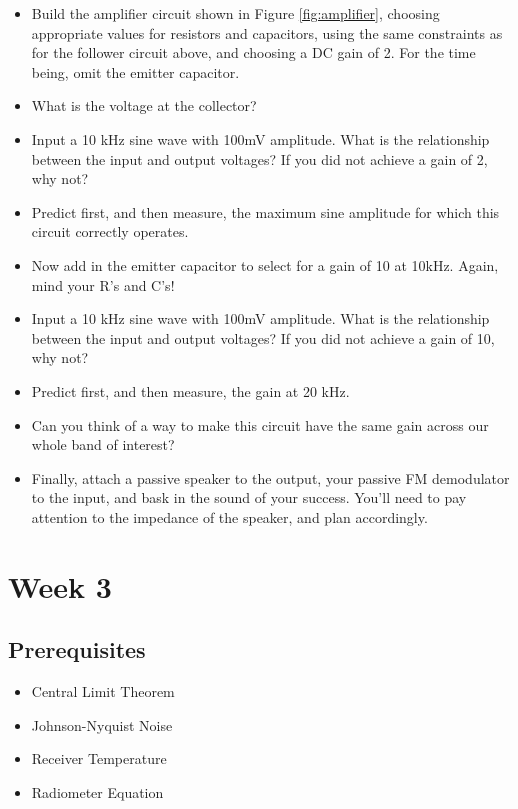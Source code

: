 \documentclass[11pt]{article}
\begin{document}
\begin{itemize}
\item Build the amplifier circuit shown in Figure \ref{fig:amplifier}, choosing appropriate values for
resistors and capacitors, using the same constraints as for the follower circuit above, and choosing a
DC gain of 2.  For the time being, omit the emitter capacitor.
\item What is the voltage at the collector?
\item Input a 10 kHz sine wave with 100mV amplitude.  What is the relationship between the 
input and output voltages?  If you did not achieve a gain of 2, why not?
\item Predict first, and then measure, the maximum sine amplitude for which this circuit correctly operates.
\item Now add in the emitter capacitor to select for a gain of 10 at 10kHz.  Again, mind your R's and C's!
\item Input a 10 kHz sine wave with 100mV amplitude.  What is the relationship between the 
input and output voltages?  If you did not achieve a gain of 10, why not?
\item Predict first, and then measure, the gain at 20 kHz.
\item Can you think of a way to make this circuit have the same gain across our whole band of interest?
\item Finally, attach a passive speaker to the output, your passive FM demodulator to the input, and bask in
the sound of your success.  You'll need to pay attention to the impedance of the speaker, and plan accordingly.
\end{itemize}

\section{Week 3}

\subsection*{Prerequisites}

\begin{itemize}
\item Central Limit Theorem
\item Johnson-Nyquist Noise
\item Receiver Temperature
\item Radiometer Equation
\end{itemize}
\end{document}
